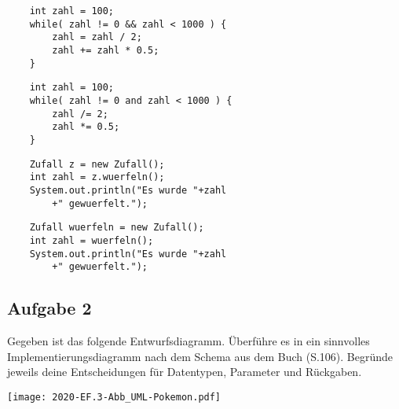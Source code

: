 \documentclass[a4paper,ngerman,fontsize=10pt]{scrartcl}
\begin{document}
\begin{minipage}{.48\linewidth}
	\begin{verbatim}
	int zahl = 100;
	while( zahl != 0 && zahl < 1000 ) {
		zahl = zahl / 2;
		zahl += zahl * 0.5;
	}
	\end{verbatim}
\end{minipage}\hfill\begin{minipage}{.48\linewidth}
	\begin{verbatim}
	int zahl = 100;
	while( zahl != 0 and zahl < 1000 ) {
		zahl /= 2;
		zahl *= 0.5;
	}
	\end{verbatim}
\end{minipage}

\begin{minipage}{.48\linewidth}
	\begin{verbatim}
	Zufall z = new Zufall();
	int zahl = z.wuerfeln();
	System.out.println("Es wurde "+zahl
		+" gewuerfelt.");
	\end{verbatim}
\end{minipage}\hfill\begin{minipage}{.48\linewidth}
	\begin{verbatim}
	Zufall wuerfeln = new Zufall();
	int zahl = wuerfeln();
	System.out.println("Es wurde "+zahl
		+" gewuerfelt.");
	\end{verbatim}
\end{minipage}

\subsection*{Aufgabe 2}
Gegeben ist das folgende Entwurfsdiagramm. Überführe es in ein sinnvolles Implementierungsdiagramm
nach dem Schema aus dem Buch (S.106). Begründe jeweils deine Entscheidungen für Datentypen, Parameter
und Rückgaben.

\begin{center}
	\texttt{[image: 2020-EF.3-Abb\_UML-Pokemon.pdf]}
\end{center}
\end{document}
